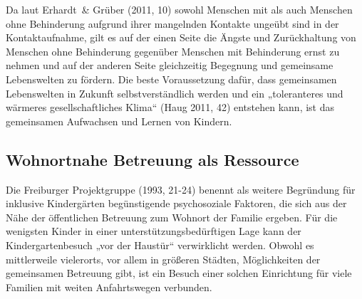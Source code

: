 Da laut Erhardt~\& Grüber (2011, 10) sowohl Menschen mit als auch Menschen ohne Behinderung aufgrund ihrer mangelnden Kontakte ungeübt sind in der Kontaktaufnahme, gilt es auf der einen Seite die Ängste und Zurückhaltung von Menschen ohne Behinderung gegenüber Menschen mit Behinderung ernst zu nehmen und auf der anderen Seite gleichzeitig Begegnung und gemeinsame Lebenswelten zu fördern. Die beste Voraussetzung dafür, dass gemeinsamen Lebenswelten in Zukunft selbstverständlich werden und ein „toleranteres und wärmeres gesellschaftliches Klima“ (Haug 2011, 42) entstehen kann, ist das gemeinsamen Aufwachsen und Lernen von Kindern. 

\subsection{Wohnortnahe Betreuung als Ressource}
Die Freiburger Projektgruppe (1993, 21-24) benennt als weitere Begründung für inklusive Kindergärten begünstigende psychosoziale Faktoren, die sich aus der Nähe der öffentlichen Betreuung zum Wohnort der Familie ergeben. Für die wenigsten Kinder in einer unterstützungsbedürftigen Lage kann der Kindergartenbesuch „vor der Haustür“ verwirklicht werden. Obwohl es mittlerweile vielerorts, vor allem in größeren Städten, Möglichkeiten der gemeinsamen Betreuung gibt, ist ein Besuch einer solchen Einrichtung für viele Familien mit weiten Anfahrtswegen verbunden. 

